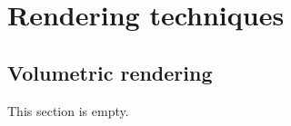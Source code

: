 \section{Rendering techniques}

\subsection{Volumetric rendering}
\label{section:volumetric-rendering}
This section is empty.